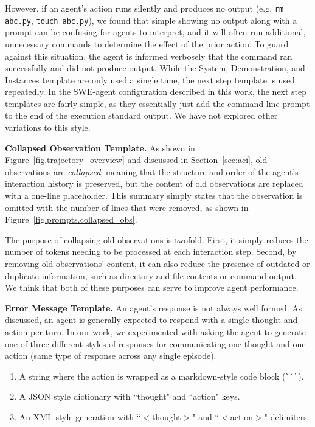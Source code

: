 

However, if an agent’s action runs silently and produces no output (e.g. \texttt{rm abc.py}, \texttt{touch abc.py}), we found that simple showing no output along with a prompt can be confusing for agents to interpret, and it will often run additional, unnecessary commands to determine the effect of the prior action.
To guard against this situation, the agent is informed verbosely that the command ran successfully and did not produce output.
While the System, Demonstration, and Instances template are only used a single time, the next step template is used repeatedly.
In the SWE-agent configuration described in this work, the next step templates are fairly simple, as they essentially just add the command line prompt to the end of the execution standard output.
We have not explored other variations to this style.

\textbf{Collapsed Observation Template.}
As shown in Figure~\ref{fig.trajectory_overview} and discussed in Section~\ref{sec:aci}, old observations are \textit{collapsed}; meaning that the structure and order of the agent's interaction history is preserved, but the content of old observations are replaced with a one-line placeholder.
This summary simply states that the observation is omitted with the number of lines that were removed, as shown in Figure~\ref{fig.prompts.collapsed_obs}.



The purpose of collapsing old observations is twofold.
First, it simply reduces the number of tokens needing to be processed at each interaction step.
Second, by removing old observations' content, it can also reduce the presence of outdated or duplicate information, such as directory and file contents or command output.
We think that both of these purposes can serve to improve agent performance.

\textbf{Error Message Template.}
An agent's response is not always well formed.
As discussed, an agent is generally expected to respond with a single thought and action per turn.
In our work, we experimented with asking the agent to generate one of three different styles of responses for communicating one thought and one action (same type of response across any single episode).

\begin{enumerate}[noitemsep]
    \item A string where the action is wrapped as a markdown-style code block (\`{}\`{}\`{}).
    \item A JSON style dictionary with ``thought" and ``action" keys.
    \item An XML style generation with ``$<$thought$>$" and ``$<$action$>$" delimiters.
\end{enumerate}

